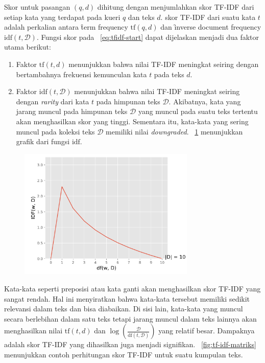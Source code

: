     Skor untuk pasangan $(q,d)$ dihitung dengan menjumlahkan skor TF-IDF dari setiap kata yang terdapat pada kueri $q$ dan teks $d$. skor TF-IDF dari suatu kata $t$ adalah perkalian antara \f{term frequency} $\text{tf}(q,d)$ dan \f{inverse document frequency} $\text{idf}(t,\mathcal{D})$. Fungsi skor pada \equ~\ref{eq:tfidf-start} dapat dijelaskan menjadi dua faktor utama berikut:
    \begin{enumerate}
        \item Faktor $\text{tf}(t, d)$ menunjukkan bahwa nilai TF-IDF meningkat seiring dengan bertambahnya frekuensi kemunculan kata $t$ pada teks $d$.
        \item Faktor $\text{idf}(t, \mathcal{D})$ menunjukkan bahwa nilai TF-IDF meningkat seiring dengan \textit{rarity} dari kata $t$ pada himpunan teks $\mathcal{D}$. Akibatnya, kata yang jarang muncul pada himpunan teks $\mathcal{D}$ yang muncul pada suatu teks tertentu akan menghasilkan skor yang tinggi. Sementara itu, kata-kata yang sering muncul pada koleksi teks $\mathcal{D}$ memiliki nilai \textit{downgraded}. \pic~\ref{fig:idf-graph} menunjukkan grafik dari fungsi $\text{idf}$.
    \end{enumerate}
    \begin{figure}[!ht]
    \centering
    \includegraphics[width=0.75\textwidth]{assets/pics/idf-graph.png}
        \label{fig:idf-graph}
    \end{figure}

    Kata-kata seperti preposisi atau kata ganti akan menghasilkan skor TF-IDF yang sangat rendah. Hal ini menyiratkan bahwa kata-kata tersebut memiliki sedikit relevansi dalam teks dan bisa diabaikan. Di sisi lain, kata-kata yang muncul secara berlebihan dalam satu teks tetapi jarang muncul dalam teks lainnya akan menghasilkan nilai $\text{tf}(t, d)$ dan $\log \left(\frac{\mathcal{D}}{\text{df}(t, \mathcal{D})}\right)$ yang relatif besar. Dampaknya adalah skor TF-IDF yang dihasilkan juga menjadi signifikan. \pic~\ref{fig:tf-idf-matriks} menunjukkan contoh perhitungan skor TF-IDF untuk suatu kumpulan teks.

